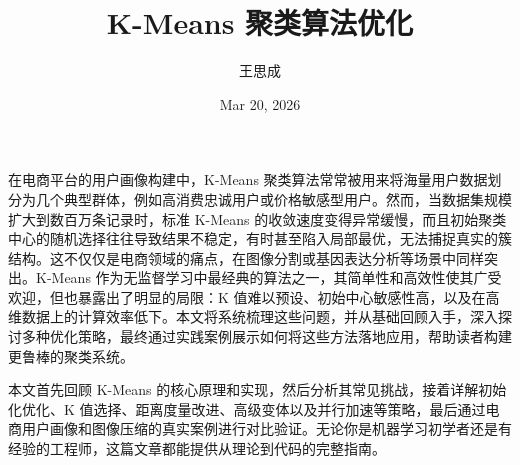 \title{K-Means 聚类算法优化}
\author{王思成}
\date{Mar 20, 2026}
\maketitle
在电商平台的用户画像构建中，K-Means 聚类算法常常被用来将海量用户数据划分为几个典型群体，例如高消费忠诚用户或价格敏感型用户。然而，当数据集规模扩大到数百万条记录时，标准 K-Means 的收敛速度变得异常缓慢，而且初始聚类中心的随机选择往往导致结果不稳定，有时甚至陷入局部最优，无法捕捉真实的簇结构。这不仅仅是电商领域的痛点，在图像分割或基因表达分析等场景中同样突出。K-Means 作为无监督学习中最经典的算法之一，其简单性和高效性使其广受欢迎，但也暴露出了明显的局限：K 值难以预设、初始中心敏感性高，以及在高维数据上的计算效率低下。本文将系统梳理这些问题，并从基础回顾入手，深入探讨多种优化策略，最终通过实践案例展示如何将这些方法落地应用，帮助读者构建更鲁棒的聚类系统。\par
本文首先回顾 K-Means 的核心原理和实现，然后分析其常见挑战，接着详解初始化优化、K 值选择、距离度量改进、高级变体以及并行加速等策略，最后通过电商用户画像和图像压缩的真实案例进行对比验证。无论你是机器学习初学者还是有经验的工程师，这篇文章都能提供从理论到代码的完整指南。\par

